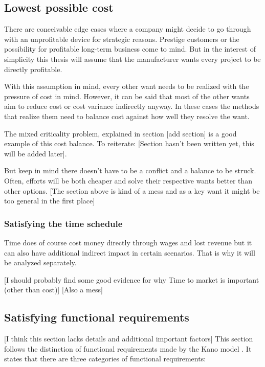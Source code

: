 \subsection{Lowest possible cost}
There are conceivable edge cases where a company might decide to go through with an unprofitable device for strategic reasons. Prestige customers or the possibility for profitable long-term business come to  mind. But in the interest of simplicity this thesis will assume that the manufacturer wants every project to be directly profitable.

With this assumption in mind, every other want needs to be realized with the pressure of cost in mind. However, it can be said that most of the other wants aim to reduce cost or cost variance indirectly anyway. In these cases the methods that realize them need to balance cost against how well they resolve the want.

The mixed criticality problem, explained in section [add section] is a good example of this cost balance. To reiterate: [Section hasn't been written yet, this will be added later]. 

But keep in mind there doesn't have to be a conflict and a balance to be struck. Often, efforts will be both cheaper and solve their respective wants better than other options.
[The section above is kind of a mess and as a key want it might be too general in the first place]
\subsubsection{Satisfying the time schedule}
Time does of course cost money directly through wages and lost revenue but it can also have additional indirect impact in certain scenarios. That is why it will be analyzed separately.

[I should probably find some good evidence for why Time to market is important (other than cost)]
[Also a mess]
\subsection{Satisfying functional requirements}
[I think this section lacks details and additional important factors]
This section follows the distinction of functional requirements made by the  Kano model \autocite{KanoNoriaki.1984}. 
It states that there are three categories of functional requirements: 
